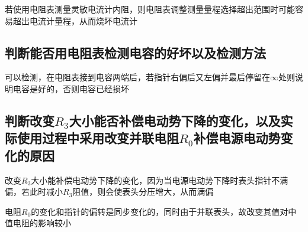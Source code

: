 \documentclass[UTF8]{ctexart}
\begin{document}
若使用电阻表测量灵敏电流计内阻，则电阻表调整测量量程选择超出范围时可能容易超出电流计量程，从而烧坏电流计
\subsection{判断能否用电阻表检测电容的好坏以及检测方法}
可以检测，在电阻表接到电容两端后，若指针右偏后又左偏并最后停留在$\infty$处则说明电容是好的，否则电容已经损坏

\subsection{判断改变$R_3$大小能否补偿电动势下降的变化，以及实际使用过程中采用改变并联电阻$R_0$补偿电源电动势变化的原因}
改变$R_3$大小能补偿电动势下降的变化，因为当电源电动势下降时表头指针不满偏，若此时减小$R_3$阻值，则会使表头分压增大，从而满偏

电阻$R_0$的变化和指针的偏转是同步变化的，同时由于并联表头，故改变其值对中值电阻的影响较小
\end{document}
